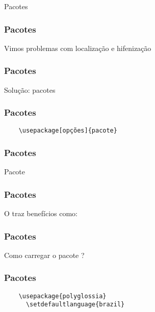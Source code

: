\begin{frame}[standout]
  \Huge
  Pacotes
\end{frame}

\begin{frame}
  \frametitle{Pacotes}
  \huge
  Vimos problemas com localização e hifenização
\end{frame}

\begin{frame}
  \frametitle{Pacotes}
  \Huge
  Solução: pacotes
\end{frame}

\begin{frame}[fragile]
  \frametitle{Pacotes}
  \begin{verbatim}
    \usepackage[opções]{pacote}
  \end{verbatim}
\end{frame}

\begin{frame}
  \frametitle{Pacotes}
  \Huge
  Pacote 
\end{frame}

\begin{frame}
  \frametitle{Pacotes}
  \Huge
  O  traz benefícios como:
  \begin{itemize}
  \end{itemize}
\end{frame}

\begin{frame}
  \frametitle{Pacotes}
  \Huge
  Como carregar o pacote ?
\end{frame}

\begin{frame}[fragile]
  \frametitle{Pacotes}
  \begin{verbatim}
    \usepackage{polyglossia}
      \setdefaultlanguage{brazil}
  \end{verbatim}
\end{frame}


